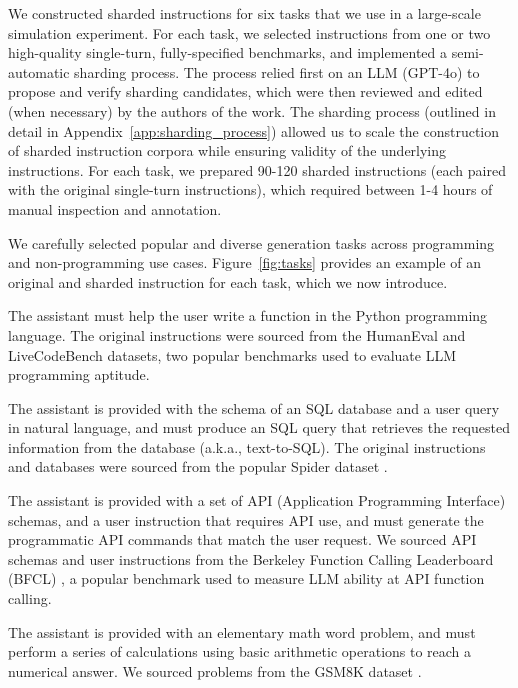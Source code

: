 \documentclass{article}
\begin{document}
We constructed sharded instructions for six tasks that we use in a large-scale simulation experiment. For each task, we selected instructions from one or two high-quality single-turn, fully-specified benchmarks, and implemented a semi-automatic sharding process. The process relied first on an LLM (GPT-4o) to propose and verify sharding candidates, which were then reviewed and edited (when necessary) by the authors of the work. The sharding process (outlined in detail in Appendix~\ref{app:sharding_process}) allowed us to scale the construction of sharded instruction corpora while ensuring validity of the underlying instructions. For each task, we prepared 90-120 sharded instructions (each paired with the original single-turn instructions), which required between 1-4 hours of manual inspection and annotation.

We carefully selected popular and diverse generation tasks across programming and non-programming use cases. Figure~\ref{fig:tasks} provides an example of an original and sharded instruction for each task, which we now introduce.

 The assistant must help the user write a function in the Python programming language. The original instructions were sourced from the HumanEval \cite{chen2021evaluating} and LiveCodeBench \cite{jain2024livecodebench} datasets, two popular benchmarks used to evaluate LLM programming aptitude.

 The assistant is provided with the schema of an SQL database and a user query in natural language, and must produce an SQL query that retrieves the requested information from the database (a.k.a., text-to-SQL). The original instructions and databases were sourced from the popular Spider dataset \cite{yu2018spider}.

 The assistant is provided with a set of API (Application Programming Interface) schemas, and a user instruction that requires API use, and must generate the programmatic API commands that match the user request. We sourced API schemas and user instructions from the Berkeley Function Calling Leaderboard (BFCL) \cite{2024bfcl}, a popular benchmark used to measure LLM ability at API function calling.

 The assistant is provided with an elementary math word problem, and must perform a series of calculations using basic arithmetic operations to reach a numerical answer. We sourced problems from the GSM8K dataset \cite{cobbe2021training}.
\end{document}
